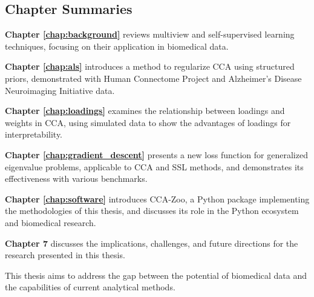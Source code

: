 \subsection{Chapter Summaries}

\textbf{Chapter \ref{chap:background}} reviews multiview and self-supervised learning techniques, focusing on their application in biomedical data.

\textbf{Chapter \ref{chap:als}} introduces a method to regularize CCA using structured priors, demonstrated with Human Connectome Project and Alzheimer's Disease Neuroimaging Initiative data.

\textbf{Chapter \ref{chap:loadings}} examines the relationship between loadings and weights in CCA, using simulated data to show the advantages of loadings for interpretability.

\textbf{Chapter \ref{chap:gradient_descent}} presents a new loss function for generalized eigenvalue problems, applicable to CCA and SSL methods, and demonstrates its effectiveness with various benchmarks.

\textbf{Chapter \ref{chap:software}} introduces CCA-Zoo, a Python package implementing the methodologies of this thesis, and discusses its role in the Python ecosystem and biomedical research.

\textbf{Chapter 7} discusses the implications, challenges, and future directions for the research presented in this thesis.

This thesis aims to address the gap between the potential of biomedical data and the capabilities of current analytical methods.
